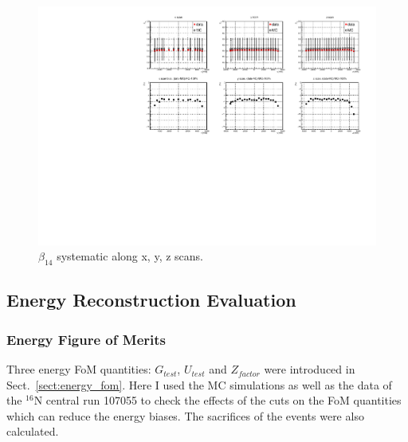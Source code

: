 \begin{figure}[htbp]
	\centering
	\includegraphics[width=15cm]{beta14_xyzScans.pdf}
	\caption{$\beta_{14}$ systematic along x, y, z scans.}
	\label{beta14_XYZscans}
\end{figure}


\subsection{Energy Reconstruction Evaluation}
\subsubsection{Energy Figure of Merits}\label{sect:energy_fomTest}
Three energy FoM quantities: $G_{test}$, $U_{test}$ and $Z_{factor}$ were introduced in Sect.~\ref{sect:energy_fom}.
Here I used the MC simulations as well as the data of the $^{16}$N central run 107055 to check the effects of the cuts on the FoM quantities which can reduce the energy biases. The sacrifices of the events were also calculated.


